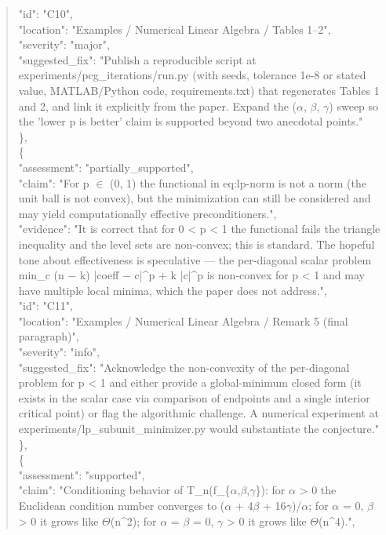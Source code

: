 \documentclass[11pt]{article}
\begin{document}
\begin{quote}
      "id": "C10",\\
      "location": "Examples / Numerical Linear Algebra / Tables 1--2",\\
      "severity": "major",\\
      "suggested\_fix": "Publish a reproducible script at experiments/pcg\_iterations/run.py (with seeds, tolerance 1e-8 or stated value, MATLAB/Python code, requirements.txt) that regenerates Tables 1 and 2, and link it explicitly from the paper. Expand the (\ensuremath{\alpha}, \ensuremath{\beta}, \ensuremath{\gamma}) sweep so the 'lower p is better' claim is supported beyond two anecdotal points."\\
    \},\\
    \{\\
      "assessment": "partially\_supported",\\
      "claim": "For p \ensuremath{\in} (0, 1) the functional in eq:lp-norm is not a norm (the unit ball is not convex), but the minimization can still be considered and may yield computationally effective preconditioners.",\\
      "evidence": "It is correct that for 0 < p < 1 the functional fails the triangle inequality and the level sets are non-convex; this is standard. The hopeful tone about effectiveness is speculative --- the per-diagonal scalar problem min\_c (n \ensuremath{-} k) |coeff \ensuremath{-} c|\^{}p + k |c|\^{}p is non-convex for p < 1 and may have multiple local minima, which the paper does not address.",\\
      "id": "C11",\\
      "location": "Examples / Numerical Linear Algebra / Remark 5 (final paragraph)",\\
      "severity": "info",\\
      "suggested\_fix": "Acknowledge the non-convexity of the per-diagonal problem for p < 1 and either provide a global-minimum closed form (it exists in the scalar case via comparison of endpoints and a single interior critical point) or flag the algorithmic challenge. A numerical experiment at experiments/lp\_subunit\_minimizer.py would substantiate the conjecture."\\
    \},\\
    \{\\
      "assessment": "supported",\\
      "claim": "Conditioning behavior of T\_n(f\_\{\ensuremath{\alpha},\ensuremath{\beta},\ensuremath{\gamma}\}): for \ensuremath{\alpha} > 0 the Euclidean condition number converges to (\ensuremath{\alpha} + 4\ensuremath{\beta} + 16\ensuremath{\gamma})/\ensuremath{\alpha}; for \ensuremath{\alpha} = 0, \ensuremath{\beta} > 0 it grows like \ensuremath{\Theta}(n\^{}2); for \ensuremath{\alpha} = \ensuremath{\beta} = 0, \ensuremath{\gamma} > 0 it grows like \ensuremath{\Theta}(n\^{}4).",\\

\end{quote}
\end{document}
